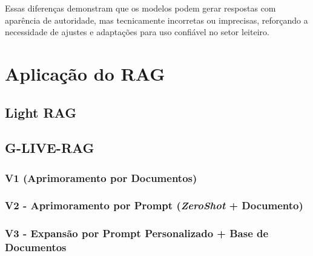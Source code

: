 Essas diferenças demonstram que os modelos podem gerar respostas com aparência de autoridade, mas tecnicamente incorretas ou imprecisas, reforçando a necessidade de ajustes e adaptações para uso confiável no setor leiteiro.



\section{Aplicação do RAG}

\subsection{Light RAG}


\subsection{G-LIVE-RAG}
\subsubsection{V1 (Aprimoramento por Documentos)}


\subsubsection{V2 - Aprimoramento por Prompt (\textit{ZeroShot} + Documento)}
\subsubsection{V3 - Expansão por Prompt Personalizado + Base de Documentos}


